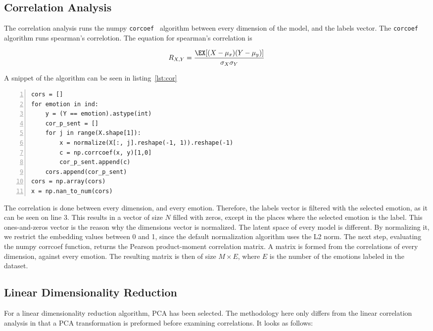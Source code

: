 \subsection{Correlation Analysis}\label{sub:Correlation Analysis Method}
The correlation analysis runs the numpy \lstinline{corcoef}~\cite{oliphant2006numpy} algorithm between every dimension of the model, and the labels vector. The \lstinline{corcoef} algorithm runs spearman's correlotion. The equation for spearman's correlation is

\begin{equation}
  R_{X,Y} = \dfrac{\EX[(X- \mu_x) (Y - \mu_y)]}
                 {\sigma_X \sigma_Y}
\end{equation}

A snippet of the algorithm can be seen in listing~\ref{lst:cor}

\begin{lstlisting}[caption={Correlation Algorithm},label=lst:cor,frame=single,numbers=left]
cors = []
for emotion in ind:
    y = (Y == emotion).astype(int)
    cor_p_sent = []
    for j in range(X.shape[1]):
        x = normalize(X[:, j].reshape(-1, 1)).reshape(-1)
        c = np.corrcoef(x, y)[1,0]
        cor_p_sent.append(c)
    cors.append(cor_p_sent)
cors = np.array(cors)
x = np.nan_to_num(cors)
\end{lstlisting}

The correlation is done between every dimension, and every emotion. Therefore, the labels vector is filtered with the selected emotion, as it can be seen on line 3. This results in a vector of size $N$ filled with zeros, except in the places where the selected emotion is the label. This ones-and-zeros vector is the reason why the dimensions vector is normalized. The latent space of every model is different. By normalizing it, we restrict the embedding values between 0 and 1, since the default normalization algorithm uses the L2 norm.
The next step, evaluating the numpy corrcoef function, returns the Pearson product-moment correlation matrix.
A matrix is formed from the correlations of every dimension, against every emotion. The resulting matrix is then of size $M \times E$, where $E$ is the number of the emotions labeled in the dataset.


\subsection{Linear Dimensionality Reduction}\label{sub:Linear Dimentionality Reduction}
For a linear dimensionality reduction algorithm, PCA has been selected. The methodology here only differs from the linear correlation analysis in that a PCA transformation is preformed before examining correlations. It looks as follows:

